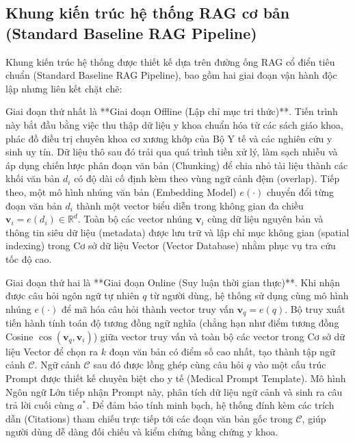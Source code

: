 \subsection{Khung kiến trúc hệ thống RAG cơ bản (Standard Baseline RAG Pipeline)}
Khung kiến trúc hệ thống được thiết kế dựa trên đường ống RAG cổ điển tiêu chuẩn (Standard Baseline RAG Pipeline), bao gồm hai giai đoạn vận hành độc lập nhưng liên kết chặt chẽ:

Giai đoạn thứ nhất là **Giai đoạn Offline (Lập chỉ mục tri thức)**. Tiến trình này bắt đầu bằng việc thu thập dữ liệu y khoa chuẩn hóa từ các sách giáo khoa, phác đồ điều trị chuyên khoa cơ xương khớp của Bộ Y tế và các nghiên cứu y sinh uy tín. Dữ liệu thô sau đó trải qua quá trình tiền xử lý, làm sạch nhiễu và áp dụng chiến lược phân đoạn văn bản (Chunking) để chia nhỏ tài liệu thành các khối văn bản $d_i$ có độ dài cố định kèm theo vùng ngữ cảnh đệm (overlap). Tiếp theo, một mô hình nhúng văn bản (Embedding Model) $e(\cdot)$ chuyển đổi từng đoạn văn bản $d_i$ thành một vector biểu diễn trong không gian đa chiều $\mathbf{v}_i = e(d_i) \in \mathbb{R}^d$. Toàn bộ các vector nhúng $\mathbf{v}_i$ cùng dữ liệu nguyên bản và thông tin siêu dữ liệu (metadata) được lưu trữ và lập chỉ mục không gian (spatial indexing) trong Cơ sở dữ liệu Vector (Vector Database) nhằm phục vụ tra cứu tốc độ cao.

Giai đoạn thứ hai là **Giai đoạn Online (Suy luận thời gian thực)**. Khi nhận được câu hỏi ngôn ngữ tự nhiên $q$ từ người dùng, hệ thống sử dụng cùng mô hình nhúng $e(\cdot)$ để mã hóa câu hỏi thành vector truy vấn $\mathbf{v}_q = e(q)$. Bộ truy xuất tiến hành tính toán độ tương đồng ngữ nghĩa (chẳng hạn như điểm tương đồng Cosine $\cos(\mathbf{v}_q, \mathbf{v}_i)$) giữa vector truy vấn và toàn bộ các vector trong Cơ sở dữ liệu Vector để chọn ra $k$ đoạn văn bản có điểm số cao nhất, tạo thành tập ngữ cảnh $\mathcal{C}$. Ngữ cảnh $\mathcal{C}$ sau đó được lồng ghép cùng câu hỏi $q$ vào một cấu trúc Prompt được thiết kế chuyên biệt cho y tế (Medical Prompt Template). Mô hình Ngôn ngữ Lớn tiếp nhận Prompt này, phân tích dữ liệu ngữ cảnh và sinh ra câu trả lời cuối cùng $a^*$. Để đảm bảo tính minh bạch, hệ thống đính kèm các trích dẫn (Citations) tham chiếu trực tiếp tới các đoạn văn bản gốc trong $\mathcal{C}$, giúp người dùng dễ dàng đối chiếu và kiểm chứng bằng chứng y khoa.
